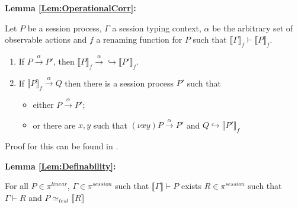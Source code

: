 \textbf{Lemma \ref{Lem:OperationalCorr}:}

Let $P$ be a session process, $\Gamma$ a session typing context, $\alpha$ be the arbitrary set of observable actions and $f$ a renaming function for $P$ such that $\llbracket \Gamma \rrbracket_f \vdash \llbracket P \rrbracket_f$.
    
    \begin{enumerate}
        \item If $P \xrightarrow{\alpha} P'$, then $\llbracket P \rrbracket_f \xrightarrow{\alpha}\hookrightarrow \llbracket P' \rrbracket_f$.
        \item If $\llbracket P \rrbracket_f \xrightarrow{\alpha} Q$ then there is a session process $P'$ such that
        \begin{itemize}
            \item either $P \xrightarrow{\alpha} P'$;
            \item or there are $x, y$ such that $(\nu xy)P \xrightarrow{\alpha} P'$ and $Q \hookrightarrow \llbracket P' \rrbracket_f$
        \end{itemize}
    \end{enumerate}

Proof for this can be found in \citep{dardha2017session}.

\vspace{10pt}


\textbf{Lemma \ref{Lem:Definability}:}

For all $P \in \pi^{linear}$, $\Gamma \in \pi^{session}$ such that $\llbracket \Gamma \rrbracket \vdash P$ exists $R \in \pi^{session}$ such that $\Gamma \vdash R$ and $P \simeq_{test} \llbracket R \rrbracket$

